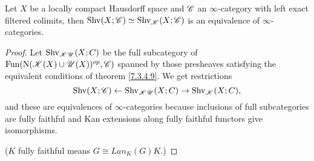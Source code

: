 \documentclass[../thesis.tex]{subfiles}
\begin{document}
\begin{corollary}\label{7.3.4.10}
    Let $X$ be a locally compact Hausdorff space and $\mathscr{C}$ an $\infty$-category with left exact filtered colimits, then $\mathrm{Shv}(X;\mathscr{C}) \simeq \mathrm{Shv}_{\mathscr{K}}(X;\mathscr{C})$ is an equivalence of $\infty$-categories.
\end{corollary}
\begin{proof}
    Let $\mathrm{Shv}_{\mathscr{K}\mathscr{U}}(X;C)$ be the full subcategory of $\mathrm{Fun}(\mathrm{N}(\mathscr{K}(X)\cup \mathscr{U}(X))^{op},\mathscr{C})$ spanned by those presheaves satisfying the equivalent conditions of theorem \ref{7.3.4.9}. We get restrictions
    \[
        \mathrm{Shv}(X;\mathscr{C}) \leftarrow \mathrm{Shv}_{\mathscr{K}\mathscr{U}}(X;C) \to \mathrm{Shv}_{\mathscr{K}}(X;C),
    \]
    and these are equivalences of $\infty$-categories because inclusions of full subcategories are fully faithful and Kan extensions along fully faithful functors give isomorphisms.

    ($K$ fully faithful means $G \cong Lan_K(G)K$.)
\end{proof}
\end{document}
